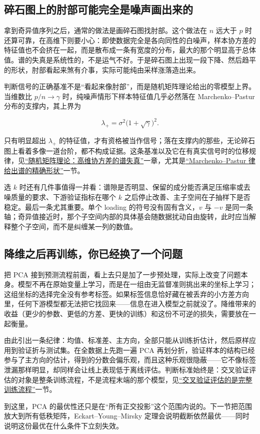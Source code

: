 \subsection{碎石图上的肘部可能完全是噪声画出来的}

拿到奇异值序列之后，通常的做法是画碎石图找肘部。这个做法在 \(n\) 远大于 \(p\) 时还算可靠，在高维下则要小心：即使数据完全是各向同性的白噪声，样本协方差的特征值也不会挤在一起，而是散布成一条有宽度的分布，最大的那个明显高于总体值。谱的失真是系统性的，不是运气不好。于是碎石图上出现一段下降、然后趋平的形状，肘部看起来煞有介事，实际可能纯由采样涨落造出来。

判断信号的正确基准不是``看起来像肘部''，而是随机矩阵理论给出的零模型上界。当维数比 \(p/n\to\gamma\) 时，纯噪声情形下样本特征值几乎必然落在 Marchenko--Pastur 分布的支撑内，其上界为

\[
\lambda_+ = \sigma^2\bigl(1+\sqrt{\gamma}\bigr)^2 .
\]

只有明显超出 \(\lambda_+\) 的特征值，才有资格被当作信号；落在支撑内的那些，无论碎石图上看着多像一道台阶，都不构成证据。这条基准以及它在有真实信号时的位移规律，见\hyperref[ch:094]{``随机矩阵理论：高维协方差的谱失真''}一章，尤其是\hyperref[sec:11-Mathematical-Statistics/09-Random-Matrix-Theory/02]{``Marchenko--Pastur 律给出谱的精确形状''}一节。

选 \(k\) 时还有几件事值得一并看：谱隙是否明显、保留的成分能否满足压缩率或去噪质量的要求、下游验证指标在哪个 \(k\) 之后停止改善、主子空间在子抽样下是否稳定。最后一条尤其重要。单个 loading 的符号没有固有含义，\(v\) 与 \(-v\) 是同一条轴；奇异值接近时，那个子空间内部的具体基会随数据扰动自由旋转，此时应当解释整个子空间，而不是纠缠某一列的数值。

\subsection{降维之后再训练，你已经换了一个问题}

把 PCA 接到预测流程前面，看上去只是加了一步预处理，实际上改变了问题本身。模型不再在原始变量上学习，而是在一组由无监督准则挑出来的坐标上学习；这组坐标的选择完全没有参考标签。如果标签信息恰好藏在被丢弃的小方差方向里，任何下游模型都无法把它找回来——信息在进入模型之前就没了。降维带来的收益（更少的参数、更低的方差、更快的训练）和这份不可逆的损失，需要放在一起衡量。

由此引出一条纪律：均值、标准差、主方向，全部只能从训练折估计，然后原样应用到验证折与测试集。在全数据上先跑一遍 PCA 再划分折，验证样本的结构已经参与了主方向的估计，得到的分数会偏乐观，而且这种乐观很隐蔽——它不像标签泄漏那样明显，却同样会让线上表现低于离线评估。判断标准始终是：交叉验证评估的对象是整条训练流程，不是流程末端的那个模型，见\hyperref[sec:11-Mathematical-Statistics/06-Resampling-and-Model-Selection/03]{``交叉验证评估的是完整训练流程''}一节。

到这里，PCA 的最优性还只是在``所有正交投影''这个范围内说的。下一节把范围放大到所有低秩矩阵，Eckart--Young--Mirsky 定理会说明截断依然最优——同时说明这份最优在什么条件下立刻失效。
